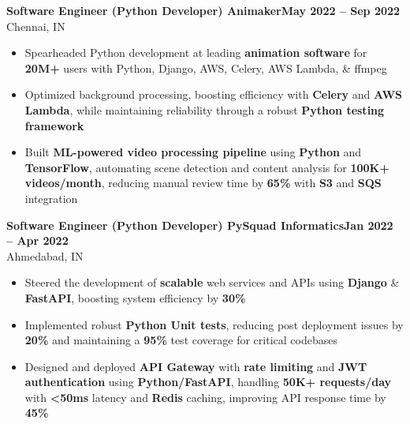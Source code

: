 \documentclass[10pt,a4paper]{article}
\begin{document}
{\vspace{2pt}
\noindent
\textbf{Software Engineer (Python Developer) \textbf{\textbar{}} Animaker}\hfill\textbf{May 2022 -- Sep 2022}\\[-2pt]
{\small Chennai, IN}
\begin{itemize}[leftmargin=0.3in, itemsep=1.5pt, topsep=0pt, parsep=0pt, partopsep=0pt, label=$\circ$]
    \item Spearheaded Python development at leading \textbf{animation software} for \textbf{20M+} users with Python, Django, AWS, Celery, AWS Lambda, \& ffmpeg
    \item Optimized background processing, boosting efficiency with \textbf{Celery} and \textbf{AWS Lambda}, while maintaining reliability through a robust \textbf{Python testing framework}
    \item Built \textbf{ML-powered video processing pipeline} using \textbf{Python} and \textbf{TensorFlow}, automating scene detection and content analysis for \textbf{100K+ videos/month}, reducing manual review time by \textbf{65\%} with \textbf{S3} and \textbf{SQS} integration
\end{itemize}

\vspace{2pt}
\noindent
\textbf{Software Engineer (Python Developer) \textbf{\textbar{}} PySquad Informatics}\hfill\textbf{Jan 2022 -- Apr 2022}\\[-2pt]
{\small Ahmedabad, IN}
\begin{itemize}[leftmargin=0.3in, itemsep=1.5pt, topsep=0pt, parsep=0pt, partopsep=0pt, label=$\circ$]
    \item Steered the development of \textbf{scalable} web services and APIs using \textbf{Django} \& \textbf{FastAPI}, boosting system efficiency by \textbf{30\%}
    \item Implemented robust \textbf{Python Unit tests}, reducing post deployment issues by \textbf{20\%} and maintaining a \textbf{95\%} test coverage for critical codebases
    \item Designed and deployed \textbf{API Gateway} with \textbf{rate limiting} and \textbf{JWT authentication} using \textbf{Python/FastAPI}, handling \textbf{50K+ requests/day} with \textbf{<50ms} latency and \textbf{Redis} caching, improving API response time by \textbf{45\%}
\end{itemize}

}
\end{document}
